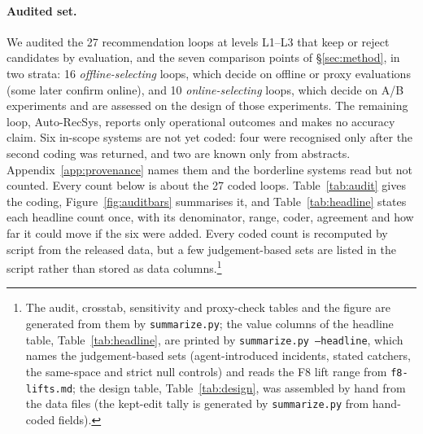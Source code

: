 \documentclass[sigconf,nonacm]{acmart}
\begin{document}
\paragraph{Audited set.} We audited the 27 recommendation loops at levels L1--L3 that keep or reject candidates by
evaluation, and the seven comparison points of \S\ref{sec:method}, in two strata: 16 \emph{offline-selecting} loops,
which decide on offline or proxy evaluations (some later confirm online), and 10 \emph{online-selecting} loops, which
decide on A/B experiments and are assessed on the design of those experiments. The remaining loop, Auto-RecSys, reports only operational
outcomes and makes no accuracy claim. Six in-scope systems are not yet coded: four were recognised only after the second coding was returned, and two are known only from abstracts. Appendix~\ref{app:provenance} names them and the borderline systems read but not counted. Every count below is about the 27 coded loops. Table~\ref{tab:audit} gives the coding, Figure~\ref{fig:auditbars} summarises it, and Table~\ref{tab:headline} states each headline count once, with its denominator, range, coder, agreement and how far it could move if the six were added. Every coded count is recomputed by script from the released data, but a few judgement-based sets are listed in the script rather than stored as data columns.\footnote{The audit, crosstab, sensitivity and proxy-check tables and the figure are generated from them by \texttt{summarize.py}; the value columns of the headline table, Table~\ref{tab:headline}, are printed by \texttt{summarize.py --headline}, which names the judgement-based sets (agent-introduced incidents, stated catchers, the same-space and strict null controls) and reads the F8 lift range from \texttt{f8-lifts.md}; the design table, Table~\ref{tab:design}, was assembled by hand from the data files (the kept-edit tally is generated by \texttt{summarize.py} from hand-coded fields).}
\end{document}
